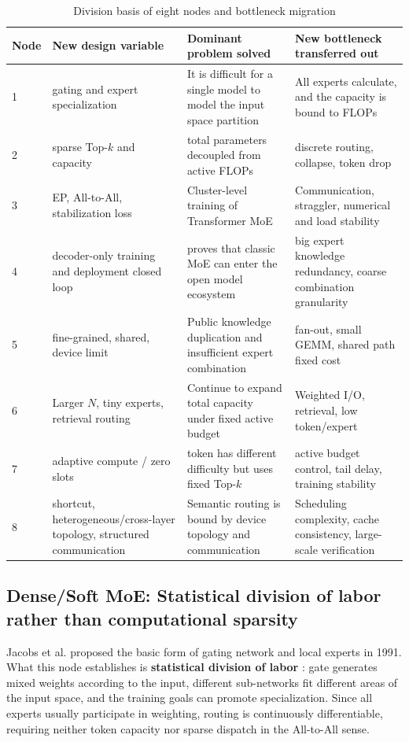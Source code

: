 \documentclass[10pt,a4paper,fontset=none]{ctexart}
\newcommand{\term}[1]{\textbf{#1}}
\begin{document}
\begin{table}[htbp]
\centering
\caption{Division basis of eight nodes and bottleneck migration}
\label{tab:evolution-nodes}
\small
\begin{tabularx}{\textwidth}{p{}p{}p{}Y}
\toprule
Node & New design variable & Dominant problem solved & New bottleneck transferred out \\
 & gating and expert specialization & It is difficult for a single model to model the input space partition & All experts calculate, and the capacity is bound to FLOPs \\
2 & sparse Top-$k$ and capacity & total parameters decoupled from active FLOPs & discrete routing, collapse, token drop \\
3 & EP, All-to-All, stabilization loss & Cluster-level training of Transformer MoE & Communication, straggler, numerical and load stability \\
4 & decoder-only training and deployment closed loop & proves that classic MoE can enter the open model ecosystem & big expert knowledge redundancy, coarse combination granularity \\
5 & fine-grained, shared, device limit & Public knowledge duplication and insufficient expert combination & fan-out, small GEMM, shared path fixed cost \\
6 & Larger $N$, tiny experts, retrieval routing & Continue to expand total capacity under fixed active budget & Weighted I/O, retrieval, low token/expert \\
7 & adaptive compute / zero slots & token has different difficulty but uses fixed Top-$k$ & active budget control, tail delay, training stability \\
8 & shortcut, heterogeneous/cross-layer topology, structured communication & Semantic routing is bound by device topology and communication & Scheduling complexity, cache consistency, large-scale verification \\
\bottomrule
\end{tabularx}
\end{table}

\subsection{Dense/Soft MoE: Statistical division of labor rather than computational sparsity}

Jacobs et al. proposed the basic form \cite{jacobs1991adaptive} of gating network and local experts in 1991. What this node establishes is \term{ statistical division of labor }: gate generates mixed weights according to the input, different sub-networks fit different areas of the input space, and the training goals can promote specialization. Since all experts usually participate in weighting, routing is continuously differentiable, requiring neither token capacity nor sparse dispatch in the All-to-All sense.
\end{document}
